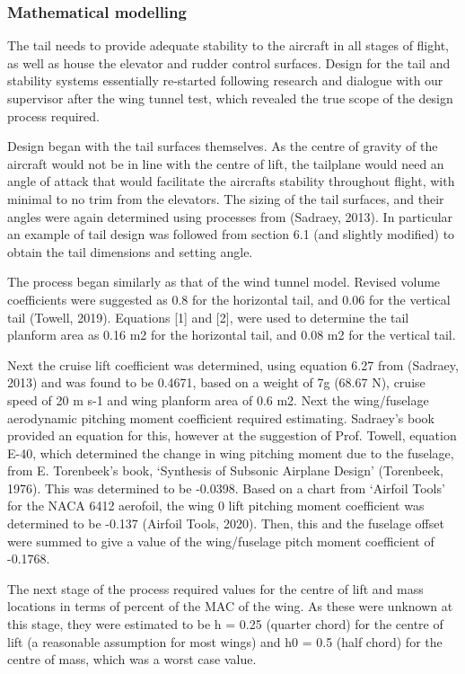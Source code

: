 \documentclass[../../main.tex]{subfiles}
\begin{document}
\subsubsection{Mathematical modelling} \label{sec:design-process:final-design-proposal:tail:mathematical-modelling}

The tail needs to provide adequate stability to the aircraft in all stages of flight, as well as house the elevator and rudder control surfaces.
Design for the tail and stability systems essentially re-started following research and dialogue with our supervisor after the wing tunnel test, which revealed the true scope of the design process required. 

Design began with the tail surfaces themselves.
As the centre of gravity of the aircraft would not be in line with the centre of lift, the tailplane would need an angle of attack that would facilitate the aircrafts stability throughout flight, with minimal to no trim from the elevators.
The sizing of the tail surfaces, and their angles were again determined using processes from (Sadraey, 2013).
In particular an example of tail design was followed from section 6.1 (and slightly modified) to obtain the tail dimensions and setting angle. 

The process began similarly as that of the wind tunnel model.
Revised volume coefficients were suggested as 0.8 for the horizontal tail, and 0.06 for the vertical tail (Towell, 2019).
Equations [1] and [2], were used to determine the tail planform area as 0.16 m2 for the horizontal tail, and 0.08 m2 for the vertical tail.  

Next the cruise lift coefficient was determined, using equation 6.27 from (Sadraey, 2013) and was found to be 0.4671, based on a weight of 7g (68.67 N), cruise speed of 20 m s-1 and wing planform area of 0.6 m2.
Next the wing/fuselage aerodynamic pitching moment coefficient required estimating.
Sadraey’s book provided an equation for this, however at the suggestion of Prof. Towell, equation E-40, which determined the change in wing pitching moment due to the fuselage, from E. Torenbeek’s book, ‘Synthesis of Subsonic Airplane Design’ (Torenbeek, 1976).
This was determined to be -0.0398.
Based on a chart from ‘Airfoil Tools’ for the NACA 6412 aerofoil, the wing 0 lift pitching moment coefficient was determined to be -0.137 (Airfoil Tools, 2020).
Then, this and the fuselage offset were summed to give a value of the wing/fuselage pitch moment coefficient of -0.1768. 

The next stage of the process required values for the centre of lift and mass locations in terms of percent of the MAC of the wing.
As these were unknown at this stage, they were estimated to be h = 0.25 (quarter chord) for the centre of lift (a reasonable assumption for most wings) and h0 = 0.5 (half chord) for the centre of mass, which was a worst case value. 
\end{document}

